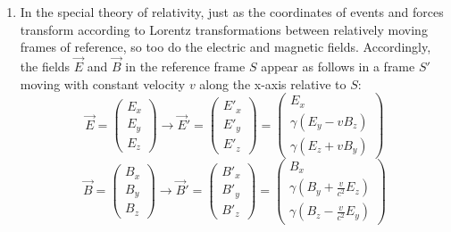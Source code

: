 \documentclass[12pt]{article}
\begin{document}
\begin{enumerate}
\begin{enumerate}
        \item \textbf{Comparison and Conclusion:}
        Calculate the distance muons travel before decaying using the dilated lifetime. Compare this distance to the thickness of the atmosphere (15 kilometers). Based on this comparison, explain why special relativity is necessary to understand how muons created in the upper atmosphere can reach the Earth's surface.
    \end{enumerate}
    \item In the special theory of relativity, just as the coordinates of events and forces transform according to Lorentz transformations between relatively moving frames of reference, so too do the electric and magnetic fields. Accordingly, the fields $\vec{E}$ and $\vec{B}$ in the reference frame $S$ appear as follows in a frame $S'$ moving with constant velocity $v$ along the x-axis relative to $S$:
\[
\vec{E} = \begin{pmatrix}
E_x \\ E_y \\ E_z
\end{pmatrix} \longrightarrow
\vec{E}' = \begin{pmatrix}
E'_x \\ E'_y \\ E'_z
\end{pmatrix} = \begin{pmatrix}
E_x \\ \gamma \left( E_y - v B_z \right)\\ \gamma \left( E_z + v B_y \right)
\end{pmatrix}
\]
\[
\vec{B} = \begin{pmatrix}
B_x \\ B_y \\ B_z
\end{pmatrix} \longrightarrow
\vec{B}' = \begin{pmatrix}
B'_x \\ B'_y \\ B'_z
\end{pmatrix} = \begin{pmatrix}
B_x \\ \gamma \left( B_y + \frac{v}{c^2} E_z \right) \\ \gamma \left( B_z - \frac{v}{c^2} E_y \right)
\end{pmatrix}
\]


\end{enumerate}
\end{document}
